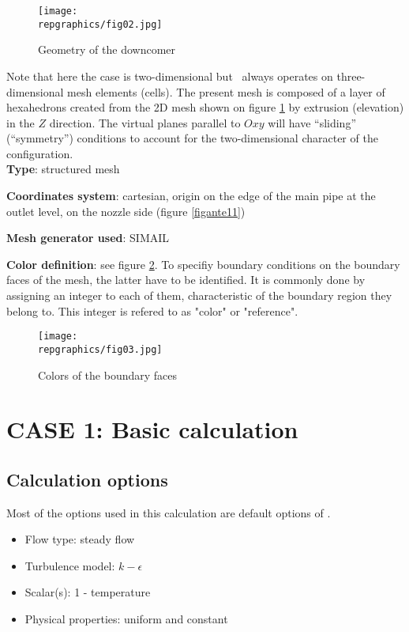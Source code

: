 \begin{figure}[h!]
\begin{center}
\texttt{[image: \\repgraphics/fig02.jpg]}
\caption{Geometry of the downcomer}
\label{figante12}
\end{center}
\end{figure}

Note that here the case is two-dimensional but \CS\ always operates on three-dimensional
mesh elements (cells). The present mesh is composed of a layer of hexahedrons
created from the 2D mesh shown on figure \ref{figante12} by
extrusion (elevation) in the $Z$ direction. The virtual planes
parallel to $Oxy$ will have ``sliding'' (``symmetry'') conditions to account for
the two-dimensional character of the configuration.\\

{\bfseries Type}: structured mesh

{\bfseries Coordinates system}: cartesian, origin on the edge of the main
pipe at the outlet level, on the nozzle side (figure \ref{figante11})

{\bfseries Mesh generator used}: SIMAIL

{\bfseries Color definition}: see figure \ref{figante13}. To specifiy boundary
conditions on the boundary faces of the mesh, the latter have to be
identified. It is commonly done by assigning an integer to each of them,
characteristic of the boundary region they belong to. This integer is refered to
as "color" or "reference".

\begin{figure}[ht]
\begin{center}
\texttt{[image: \\repgraphics/fig03.jpg]}
\caption{Colors of the boundary faces}
\label{figante13}
\end{center}
\end{figure}


\section{CASE 1: Basic calculation}

        \subsection{Calculation options}

Most of the options used in this calculation are default options of \CS.
\begin{itemize}
\renewcommand{\labelitemi}{$\rightarrow$}
        \item Flow type: steady flow
        \item Turbulence model: $k-\epsilon$
        \item Scalar(s): 1 - temperature
        \item Physical properties: uniform and constant
\end{itemize}


